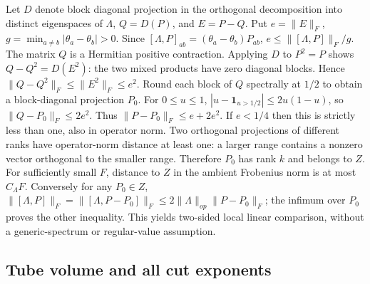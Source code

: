 \documentclass[11pt]{article}
\begin{document}
Let \(D\) denote block diagonal projection in the orthogonal decomposition into distinct eigenspaces of \(\Lambda\), \(Q=D(P)\), and \(E=P-Q\). Put \(e=\|E\|_F\), \(g=\min_{a\ne b}|\theta_a-\theta_b|>0\). Since \([\Lambda,P]_{ab}=(\theta_a-\theta_b)P_{ab}\), \(e\le \|[\Lambda,P]\|_F/g\). The matrix \(Q\) is a Hermitian positive contraction. Applying \(D\) to \(P^2=P\) shows \(Q-Q^2=D(E^2)\): the two mixed products have zero diagonal blocks. Hence \(\|Q-Q^2\|_F\le\|E^2\|_F\le e^2\). Round each block of \(Q\) spectrally at \(1/2\) to obtain a block-diagonal projection \(P_0\). For \(0\le u\le1\), \(|u-\mathbf 1_{u>1/2}|\le2u(1-u)\), so \(\|Q-P_0\|_F\le2e^2\). Thus \(\|P-P_0\|_F\le e+2e^2\). If \(e<1/4\) then this is strictly less than one, also in operator norm. Two orthogonal projections of different ranks have operator-norm distance at least one: a larger range contains a nonzero vector orthogonal to the smaller range. Therefore \(P_0\) has rank \(k\) and belongs to \(Z\). For sufficiently small \(F\), distance to \(Z\) in the ambient Frobenius norm is at most \(C_{\Lambda}F\). Conversely for any \(P_0\in Z\), \(\|[\Lambda,P]\|_F=\|[\Lambda,P-P_0]\|_F\le2\|\Lambda\|_{op}\|P-P_0\|_F\); the infimum over \(P_0\) proves the other inequality. This yields two-sided local linear comparison, without a generic-spectrum or regular-value assumption.

\subsection{Tube volume and all cut exponents}\label{tube-volume-and-all-cut-exponents}
\end{document}
